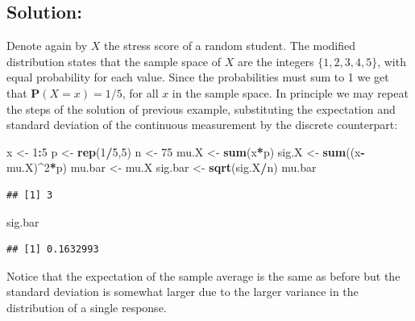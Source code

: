 \documentclass[
]{krantz}
\makeatletter
\newenvironment{Shaded}{\begin{snugshade}}{\end{snugshade}}
\newcommand{\DecValTok}[1]{\textcolor[rgb]{0.00,0.00,0.81}{#1}}
\newcommand{\KeywordTok}[1]{\textcolor[rgb]{0.13,0.29,0.53}{\textbf{#1}}}
\newcommand{\NormalTok}[1]{#1}
\newcommand{\OperatorTok}[1]{\textcolor[rgb]{0.81,0.36,0.00}{\textbf{#1}}}
\newcommand{\StringTok}[1]{\textcolor[rgb]{0.31,0.60,0.02}{#1}}
\newcommand{\Prob}{\mathbf{P}}
\newenvironment{kframe}{%
\medskip{}
\setlength{\fboxsep}{.8em}
 \def\at@end@of@kframe{}%
 \ifinner\ifhmode%
  \def\at@end@of@kframe{\end{minipage}}%
  \begin{minipage}{\columnwidth}%
 \fi\fi%
 \def\FrameCommand##1{\hskip\@totalleftmargin \hskip-\fboxsep
 \colorbox{shadecolor}{##1}\hskip-\fboxsep
     \hskip-\linewidth \hskip-\@totalleftmargin \hskip\columnwidth}%
 \MakeFramed {\advance\hsize-\width
   \@totalleftmargin\z@ \linewidth\hsize
   \@setminipage}}%
 {\par\unskip\endMakeFramed%
 \at@end@of@kframe}
\renewenvironment{Shaded}{\begin{kframe}}{\end{kframe}}
\theoremstyle{definition}
\theoremstyle{definition}
\theoremstyle{definition}
\theoremstyle{remark}
\makeatother
\begin{document}
\hypertarget{solution-1}{%
\subsection*{Solution:}\label{solution-1}}


Denote again by \(X\) the stress score of a random student. The modified
distribution states that the sample space of \(X\) are the integers
\(\{1, 2, 3, 4, 5\}\), with equal probability for each value. Since the
probabilities must sum to 1 we get that \(\Prob(X = x) = 1/5\), for all
\(x\) in the sample space. In principle we may repeat the steps of the
solution of previous example, substituting the expectation and standard
deviation of the continuous measurement by the discrete counterpart:

\begin{Shaded}
\begin{Highlighting}[]
\NormalTok{x <-}\StringTok{ }\DecValTok{1}\OperatorTok{:}\DecValTok{5}
\NormalTok{p <-}\StringTok{ }\KeywordTok{rep}\NormalTok{(}\DecValTok{1}\OperatorTok{/}\DecValTok{5}\NormalTok{,}\DecValTok{5}\NormalTok{)}
\NormalTok{n <-}\StringTok{ }\DecValTok{75}
\NormalTok{mu.X <-}\StringTok{ }\KeywordTok{sum}\NormalTok{(x}\OperatorTok{*}\NormalTok{p)}
\NormalTok{sig.X <-}\StringTok{ }\KeywordTok{sum}\NormalTok{((x}\OperatorTok{-}\NormalTok{mu.X)}\OperatorTok{^}\DecValTok{2}\OperatorTok{*}\NormalTok{p)}
\NormalTok{mu.bar <-}\StringTok{ }\NormalTok{mu.X}
\NormalTok{sig.bar <-}\StringTok{ }\KeywordTok{sqrt}\NormalTok{(sig.X}\OperatorTok{/}\NormalTok{n)}
\NormalTok{mu.bar}
\end{Highlighting}
\end{Shaded}

\begin{verbatim}
## [1] 3
\end{verbatim}

\begin{Shaded}
\begin{Highlighting}[]
\NormalTok{sig.bar}
\end{Highlighting}
\end{Shaded}

\begin{verbatim}
## [1] 0.1632993
\end{verbatim}

Notice that the expectation of the sample average is the same as before
but the standard deviation is somewhat larger due to the larger variance
in the distribution of a single response.
\end{document}
